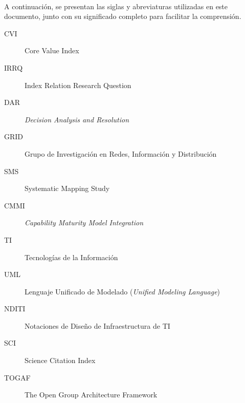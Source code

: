 \label{cap:siglas}
\mbox{}\\
A continuación, se presentan las siglas y abreviaturas utilizadas en este documento, junto con su significado completo para facilitar la comprensión.
\begin{description}
	\item [CVI] Core Value Index
	\item [IRRQ] Index Relation Research Question
	\item[DAR] \textit{Decision Analysis and Resolution}
	\item[GRID] Grupo de Investigación en Redes, Información y Distribución
	\item[SMS] Systematic Mapping Study
	\item[CMMI] \textit{Capability Maturity Model Integration}
	\item[TI] Tecnologías de la Información
	\item[UML] Lenguaje Unificado de Modelado (\textit{Unified Modeling Language})
	\item[NDITI] Notaciones de Diseño de Infraestructura de TI
	\item [SCI] Science Citation Index
	\item [TOGAF] The Open Group Architecture Framework
\end{description}
